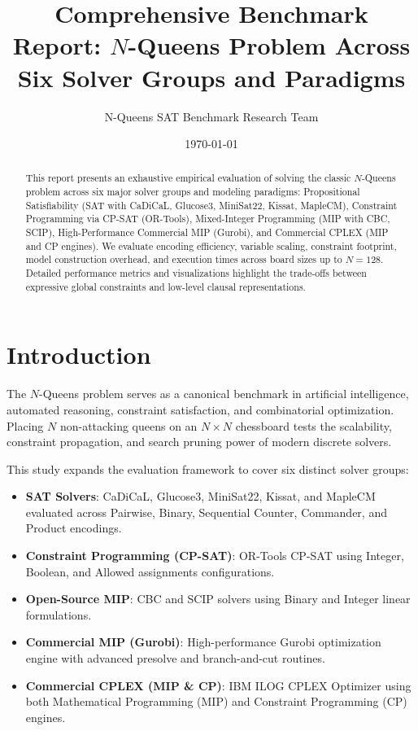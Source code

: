 \documentclass[a4paper,fleqn]{cas-sc}
\title{\textbf{Comprehensive Benchmark Report: $N$-Queens Problem Across Six Solver Groups and Paradigms}}
\author{N-Queens SAT Benchmark Research Team}
\date{\today}
\begin{document}
\begin{frontmatter}
\maketitle

\begin{abstract}
This report presents an exhaustive empirical evaluation of solving the classic $N$-Queens problem across six major solver groups and modeling paradigms: Propositional Satisfiability (SAT with CaDiCaL, Glucose3, MiniSat22, Kissat, MapleCM), Constraint Programming via CP-SAT (OR-Tools), Mixed-Integer Programming (MIP with CBC, SCIP), High-Performance Commercial MIP (Gurobi), and Commercial CPLEX (MIP and CP engines). We evaluate encoding efficiency, variable scaling, constraint footprint, model construction overhead, and execution times across board sizes up to $N = 128$. Detailed performance metrics and visualizations highlight the trade-offs between expressive global constraints and low-level clausal representations.
\end{abstract}
\end{frontmatter}

\section{Introduction}
The $N$-Queens problem serves as a canonical benchmark in artificial intelligence, automated reasoning, constraint satisfaction, and combinatorial optimization. Placing $N$ non-attacking queens on an $N \times N$ chessboard tests the scalability, constraint propagation, and search pruning power of modern discrete solvers. 

This study expands the evaluation framework to cover six distinct solver groups:
\begin{itemize}
    \item \textbf{SAT Solvers}: CaDiCaL, Glucose3, MiniSat22, Kissat, and MapleCM evaluated across Pairwise, Binary, Sequential Counter, Commander, and Product encodings.
    \item \textbf{Constraint Programming (CP-SAT)}: OR-Tools CP-SAT using Integer, Boolean, and Allowed assignments configurations.
    \item \textbf{Open-Source MIP}: CBC and SCIP solvers using Binary and Integer linear formulations.
    \item \textbf{Commercial MIP (Gurobi)}: High-performance Gurobi optimization engine with advanced presolve and branch-and-cut routines.
    \item \textbf{Commercial CPLEX (MIP \& CP)}: IBM ILOG CPLEX Optimizer using both Mathematical Programming (MIP) and Constraint Programming (CP) engines.
\end{itemize}
\end{document}
